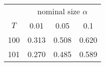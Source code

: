 % 
\begin{tabular}{cccc}
  \hline
  & \multicolumn{3}{c}{nominal size $\alpha$} \\
 $T$ & 0.01 & 0.05 & 0.1 \\
 \hline
100 & 0.313 & 0.508 & 0.620 \\ 
  101 & 0.270 & 0.485 & 0.589 \\ 
   \hline
\end{tabular}
